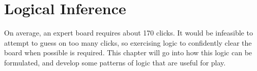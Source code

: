 \chapter{Logical Inference}\label{sec:ng}
On average, an expert board requires about 170 clicks. It would be infeasible to attempt to guess on too many clicks, so exercising logic to confidently clear the board when possible is required. This chapter will go into how this logic can be formulated, and develop some patterns of logic that are useful for play.








